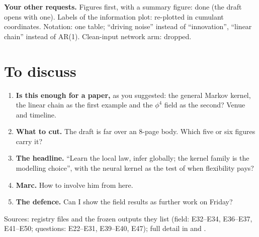 \documentclass[11pt,a4paper]{article}
\begin{document}
\textbf{Your other requests.} Figures first, with a summary figure: done (the draft opens with one). Labels of the information
plot: re-plotted in cumulant coordinates. Notation: one table; ``driving noise'' instead of ``innovation'', ``linear chain''
instead of AR(1). Clean-input network arm: dropped.

\section{To discuss}
\label{app:discuss}
\begin{enumerate}[leftmargin=1.6em]
\item \textbf{Is this enough for a paper,} as you suggested: the general Markov kernel, the linear chain as the first example
and the $\phi^4$ field as the second? Venue and timeline.
\item \textbf{What to cut.} The draft is far over an 8-page body. Which five or six figures carry it?
\item \textbf{The headline.} ``Learn the local law, infer globally; the kernel family is the modelling choice'', with the
neural kernel as the test of when flexibility pays?
\item \textbf{Marc.} How to involve him from here.
\item \textbf{The defence.} Can I show the field results as further work on Friday?
\end{enumerate}

\vfill
{\footnotesize\raggedright Sources: registry files  and the frozen outputs they list (field: E32--E34,
E36--E37, E41--E50; questions: E22--E31, E39--E40, E47); full detail in  and
.\par}
\end{document}
